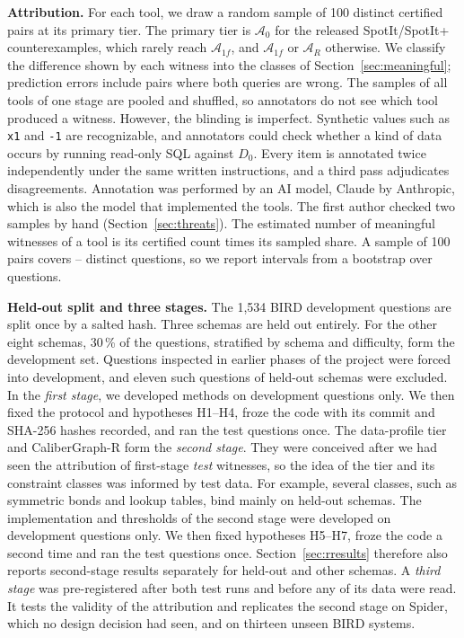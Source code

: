 \textbf{Attribution.}\label{sec:attribution} For each tool, we draw a random sample of 100 distinct certified pairs at its primary tier. The primary tier is $\mathcal A_0$ for the released SpotIt/SpotIt+ counterexamples, which rarely reach $\mathcal A_{1f}$, and $\mathcal A_{1f}$ or $\mathcal A_R$ otherwise. We classify the difference shown by each witness into the classes of Section~\ref{sec:meaningful}; prediction errors include pairs where both queries are wrong. The samples of all tools of one stage are pooled and shuffled, so annotators do not see which tool produced a witness. However, the blinding is imperfect. Synthetic values such as \texttt{\textquotesingle{}x1\textquotesingle{}} and \texttt{-1} are recognizable, and annotators could check whether a kind of data occurs by running read-only SQL against $D_0$. Every item is annotated twice independently under the same written instructions, and a third pass adjudicates disagreements. Annotation was performed by an AI model, Claude by Anthropic, which is also the model that implemented the tools. The first author checked two samples by hand (Section~\ref{sec:threats}). The estimated number of meaningful witnesses of a tool is its certified count times its sampled share. A sample of 100 pairs covers -- distinct questions, so we report intervals from a bootstrap over questions.

\textbf{Held-out split and three stages.} The 1,534 BIRD development questions are split once by a salted hash. Three schemas are held out entirely. For the other eight schemas, 30\,\% of the questions, stratified by schema and difficulty, form the development set. Questions inspected in earlier phases of the project were forced into development, and eleven such questions of held-out schemas were excluded. In the \emph{first stage}, we developed methods on development questions only. We then fixed the protocol and hypotheses H1--H4, froze the code with its commit and SHA-256 hashes recorded, and ran the test questions once. The data-profile tier and CaliberGraph-R form the \emph{second stage}. They were conceived after we had seen the attribution of first-stage \emph{test} witnesses, so the idea of the tier and its constraint classes was informed by test data. For example, several classes, such as symmetric bonds and lookup tables, bind mainly on held-out schemas. The implementation and thresholds of the second stage were developed on development questions only. We then fixed hypotheses H5--H7, froze the code a second time and ran the test questions once. Section~\ref{sec:rresults} therefore also reports second-stage results separately for held-out and other schemas. A \emph{third stage} was pre-registered after both test runs and before any of its data were read. It tests the validity of the attribution and replicates the second stage on Spider, which no design decision had seen, and on thirteen unseen BIRD systems.

